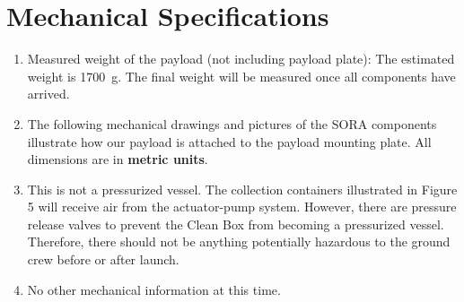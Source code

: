 \section{Mechanical Specifications}
\label{sec:Mechanical}

\hspace*{0.5cm}
\begin{minipage}{\linewidth-0.5cm}
  
  \begin{enumerate}[label=\Alph*.]
    
  \item Measured weight of the payload (not including payload plate): \newline
    The estimated weight is \SI{1700}{\gram}. The final weight will be measured once all components have arrived.
    
  \item The following mechanical drawings and pictures of the SORA components illustrate how our payload is attached to the payload mounting plate. All dimensions are in \textbf{metric units}.
    
  \item This is not a pressurized vessel. The collection containers illustrated in Figure 5 will receive air from the actuator-pump system. However, there are pressure release valves to prevent the Clean Box from becoming a pressurized vessel. Therefore, there should not be anything potentially hazardous to the ground crew before or after launch.

  \item No other mechanical information at this time.
    
  \end{enumerate}
  
\end{minipage}
